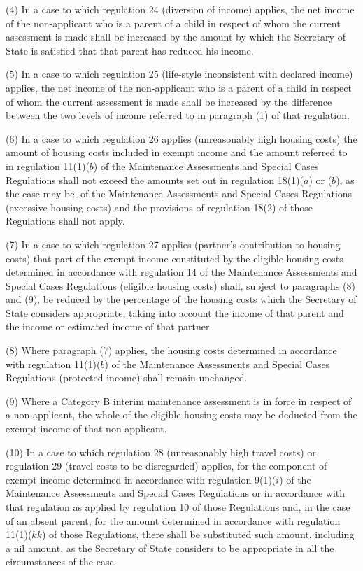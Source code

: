 \documentclass[a4paper]{article}
\begin{document}
(4) In a case to which regulation 24 (diversion of income) applies, the net
income of the non-applicant who is a parent of a child in respect of whom the
current assessment is made shall be increased by the amount by which the
Secretary of State is satisfied that that parent has reduced his income.

(5) In a case to which regulation 25 (life-style inconsistent with declared
income) applies, the net income of the non-applicant who is a parent of a child
in respect of whom the current assessment is made shall be increased by the
difference between the two levels of income referred to in paragraph (1) of that
regulation.

(6) In a case to which regulation 26 applies (unreasonably high housing costs)
the amount of housing costs included in exempt income and the amount referred to
in regulation 11(1)($b$) of the Maintenance Assessments and Special Cases
Regulations shall not exceed the amounts set out in regulation 18(1)($a$) or ($b$),
as the case may be, of the Maintenance Assessments and Special Cases Regulations
(excessive housing costs) and the provisions of regulation 18(2) of those
Regulations shall not apply.

(7) In a case to which regulation 27 applies (partner’s contribution to housing
costs) that part of the exempt income constituted by the eligible housing costs
determined in accordance with regulation 14 of the Maintenance Assessments and
Special Cases Regulations (eligible housing costs) shall, subject to paragraphs
(8) and (9), be reduced by the percentage of the housing costs which the
Secretary of State considers appropriate, taking into account the income of that
parent and the income or estimated income of that partner.

(8) Where paragraph (7) applies, the housing costs determined in accordance with
regulation 11(1)($b$) of the Maintenance Assessments and Special Cases Regulations
(protected income) shall remain unchanged.

(9) Where a Category B interim maintenance assessment is in force in respect of
a non-applicant, the whole of the eligible housing costs may be deducted from
the exempt income of that non-applicant.

(10) In a case to which regulation 28 (unreasonably high travel costs) or
regulation 29 (travel costs to be disregarded) applies, for the component of
exempt income determined in accordance with regulation 9(1)($i$) of the
Maintenance Assessments and Special Cases Regulations or in accordance with that
regulation as applied by regulation 10 of those Regulations and, in the case of
an absent parent, for the amount determined in accordance with regulation
11(1)($kk$) of those Regulations, there shall be substituted such amount,
including a nil amount, as the Secretary of State considers to be appropriate in
all the circumstances of the case.
\end{document}
